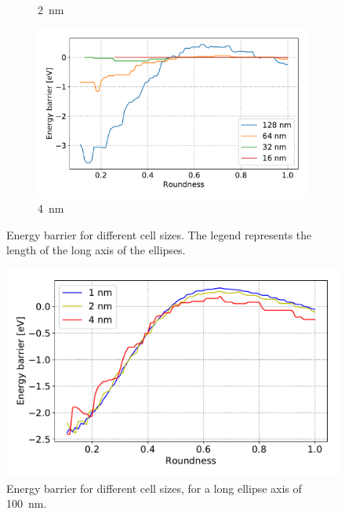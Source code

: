 \documentclass[10pt,a4paper]{article}
\begin{document}
\begin{figure}
\begin{subfigure}[b]{0.75\textwidth}
         \caption{\SI{2}{\nano\metre}}
         \label{fig:barrier-cell_size-2nm}
     \end{subfigure}
     \hfill
     \begin{subfigure}[b]{0.75\textwidth}
         \centering
         \includegraphics[width=\textwidth]{Figures/biaxial_island/Barrier/Plus_16-128_0.1-1_aPi4_B0.001_cell4nm.pdf}
         \caption{\SI{4}{\nano\metre}}
         \label{fig:barrier-cell_size-4nm}
     \end{subfigure}
        \caption{Energy barrier for different cell sizes. The legend represents the length of the long axis of the ellipses.}
        \label{fig:barrier-cell_size}
\end{figure}
\begin{figure}
    \centering
    \includegraphics[width=0.9\columnwidth]{Figures/biaxial_island/Barrier/Plus_100_0.1-1_aPi4_B0.001.pdf}
    \caption{Energy barrier for different cell sizes, for a long ellipse axis of \SI{100}{\nano\metre}.}
    \label{fig:barrier-cell_size-100nm}
\end{figure}
\end{document}
